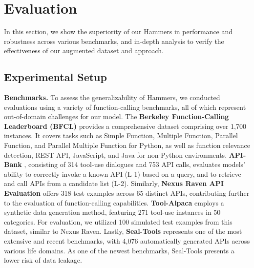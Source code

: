 \documentclass{article}
\begin{document}
\section{Evaluation}

In this section, we show the superiority of our Hammers in performance and robustness across various benchmarks, and in-depth analysis to verify the effectiveness of our augmented dataset and approach.


\subsection{Experimental Setup}

\textbf{Benchmarks.} To assess the generalizability of Hammers, we conducted evaluations using a variety of function-calling benchmarks, all of which represent out-of-domain challenges for our model. The \textbf{Berkeley Function-Calling Leaderboard (BFCL)} \citep{berkeley-function-calling-leaderboard} provides a comprehensive dataset comprising over 1,700 instances. It covers tasks such as Simple Function, Multiple Function, Parallel Function, and Parallel Multiple Function for Python, as well as function relevance detection, REST API, JavaScript, and Java for non-Python environments. \textbf{API-Bank} \citep{li2023apibankcomprehensivebenchmarktoolaugmented}, consisting of 314 tool-use dialogues and 753 API calls, evaluates models' ability to correctly invoke a known API (L-1) based on a query, and to retrieve and call APIs from a candidate list (L-2). Similarly, \textbf{Nexus Raven API Evaluation} \citep{srinivasan2023nexusraven} offers 318 test examples across 65 distinct APIs, contributing further to the evaluation of function-calling capabilities. \textbf{Tool-Alpaca} \citep{tang2023toolalpaca} employs a synthetic data generation method, featuring 271 tool-use instances in 50 categories. For evaluation, we utilized 100 simulated test examples from this dataset, similar to Nexus Raven. Lastly, \textbf{Seal-Tools} \citep{wu2024sealtoolsselfinstructtoollearning} represents one of the most extensive and recent benchmarks, with 4,076 automatically generated APIs across various life domains. As one of the newest benchmarks, Seal-Tools presents a lower risk of data leakage. 
\end{document}
